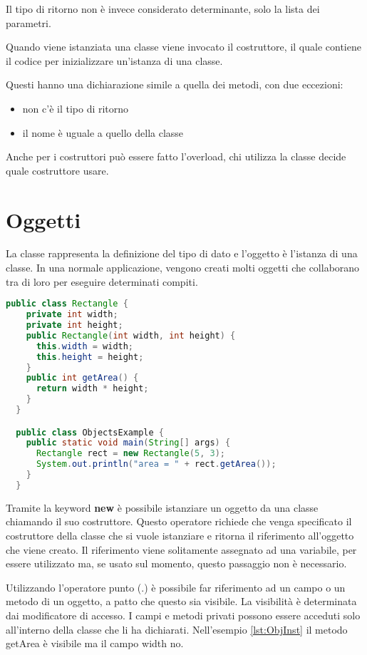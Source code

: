 \documentclass[a4paper,12pt,twoside]{book}
\begin{document}
Il tipo di ritorno non è invece considerato determinante, solo la
lista dei parametri.

Quando viene istanziata una classe viene invocato il costruttore, il
quale contiene il codice per inizializzare un'istanza di una classe. 

Questi hanno una dichiarazione simile a quella dei metodi, con due
eccezioni:

\begin{itemize}
\item non c'è il tipo di ritorno
\item il nome è uguale a quello della classe
\end{itemize}

Anche per i costruttori può essere fatto l'overload, chi utilizza la
classe decide quale costruttore usare.

\section{Oggetti}

La classe rappresenta la definizione del tipo di dato e l'oggetto è
l'istanza di una classe. In una normale applicazione, vengono creati
molti oggetti che collaborano tra di loro per eseguire determinati
compiti.


\begin{lstlisting}[caption={Oggetti e istanziazione}, label={lst:ObjInst},
  language=Java]
  public class Rectangle {
    private int width;
    private int height;
    public Rectangle(int width, int height) {
      this.width = width;
      this.height = height;
    }
    public int getArea() {
      return width * height;
    }
  }

  public class ObjectsExample {
    public static void main(String[] args) {
      Rectangle rect = new Rectangle(5, 3);
      System.out.println("area = " + rect.getArea());
    }
  }
\end{lstlisting}


Tramite la keyword \textbf{new} è possibile istanziare un oggetto da
una classe chiamando il suo costruttore.  Questo operatore richiede che
venga specificato il costruttore della classe che si vuole istanziare
e ritorna il riferimento all’oggetto che viene creato. Il riferimento
viene solitamente assegnato ad una variabile, per essere utilizzato
ma, se usato sul momento, questo passaggio non è necessario.

Utilizzando l’operatore punto (.) è possibile far riferimento ad un
campo o un metodo di un oggetto, a patto che questo sia visibile. La
visibilità è determinata dai modificatore di accesso. I campi e metodi
privati possono essere acceduti solo all’interno della classe che li
ha dichiarati. Nell'esempio \ref{lst:ObjInst} il metodo getArea è
visibile ma il campo width no.
\end{document}
